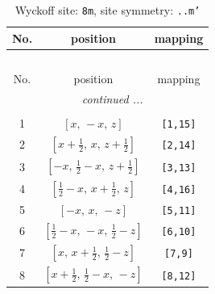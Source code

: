 \documentclass[fleqn,8pt]{jsarticle}
\begin{document}
\begin{longtable}{ccc}
\caption{Wyckoff site: {\tt 8m}, site symmetry: {\tt ..m'}}
 \\
 \hline \hline
No. & position & mapping \\ \hline \endfirsthead

\multicolumn{2}{l}{\tablename\ \thetable{}} \\
 \hline \hline
No. & position & mapping \\ \hline \endhead

 \hline \hline
\multicolumn{2}{r}{\footnotesize\it continued ...} \\ \endfoot

 \hline \hline
\multicolumn{2}{r}{} \\ \endlastfoot

1 & $\left[ x,\, - x,\, z \right]$ & {\tt [1,15]} \\ \hline
2 & $\left[ x + \frac{1}{2},\, x,\, z + \frac{1}{2} \right]$ & {\tt [2,14]} \\ \hline
3 & $\left[ - x,\, \frac{1}{2} - x,\, z + \frac{1}{2} \right]$ & {\tt [3,13]} \\ \hline
4 & $\left[ \frac{1}{2} - x,\, x + \frac{1}{2},\, z \right]$ & {\tt [4,16]} \\ \hline
5 & $\left[ - x,\, x,\, - z \right]$ & {\tt [5,11]} \\ \hline
6 & $\left[ \frac{1}{2} - x,\, - x,\, \frac{1}{2} - z \right]$ & {\tt [6,10]} \\ \hline
7 & $\left[ x,\, x + \frac{1}{2},\, \frac{1}{2} - z \right]$ & {\tt [7,9]} \\ \hline
8 & $\left[ x + \frac{1}{2},\, \frac{1}{2} - x,\, - z \right]$ & {\tt [8,12]} \\
\end{longtable}
\renewcommand{\arraystretch}{1.2}
\end{document}
